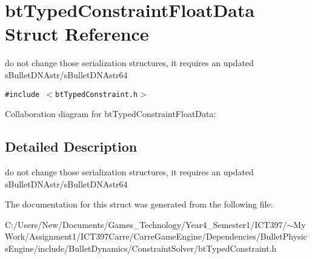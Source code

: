 \hypertarget{structbt_typed_constraint_float_data}{
\section{btTypedConstraintFloatData Struct Reference}
\label{structbt_typed_constraint_float_data}
}
do not change those serialization structures, it requires an updated sBulletDNAstr/sBulletDNAstr64  


{\tt \#include $<$btTypedConstraint.h$>$}

Collaboration diagram for btTypedConstraintFloatData:

\subsection{Detailed Description}
do not change those serialization structures, it requires an updated sBulletDNAstr/sBulletDNAstr64 

The documentation for this struct was generated from the following file:\begin{CompactItemize}
\item 
C:/Users/New/Documents/Games\_\-Technology/Year4\_\-Semester1/ICT397/$\sim$My Work/Assignment1/ICT397Carre/CarreGameEngine/Dependencies/BulletPhysicsEngine/include/BulletDynamics/ConstraintSolver/btTypedConstraint.h\end{CompactItemize}

